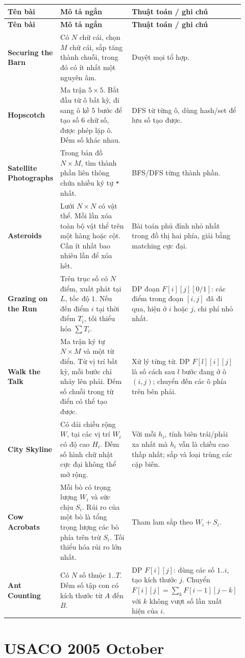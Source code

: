 \documentclass[11pt]{article}
\newenvironment{solutiontable}{%
  \small
  \setlength{\tabcolsep}{4pt}
  \renewcommand{\arraystretch}{1.14}
  \begin{longtable}{L{0.19\linewidth}L{0.39\linewidth}L{0.34\linewidth}}
  \toprule
  \textbf{Tên bài} & \textbf{Mô tả ngắn} & \textbf{Thuật toán / ghi chú}\\
  \midrule
  \endfirsthead
  \toprule
  \textbf{Tên bài} & \textbf{Mô tả ngắn} & \textbf{Thuật toán / ghi chú}\\
  \midrule
  \endhead
}{%
  \bottomrule
  \end{longtable}
  \normalsize
}
\newcommand{\problemrow}[3]{\textbf{#1} & #2 & #3\\\midrule}
\begin{document}
\begin{solutiontable}
\problemrow{Securing the Barn}{Có \(N\) chữ cái, chọn \(M\) chữ cái, sắp tăng thành chuỗi, trong đó có ít nhất một nguyên âm.}{Duyệt mọi tổ hợp.}
\problemrow{Hopscotch}{Ma trận \(5\times5\). Bắt đầu từ ô bất kỳ, đi sang ô kề \(5\) bước để tạo số \(6\) chữ số, được phép lặp ô. Đếm số khác nhau.}{DFS từ từng ô, dùng hash/set để lưu số tạo được.}
\problemrow{Satellite Photographs}{Trong bản đồ \(N\times M\), tìm thành phần liên thông chứa nhiều ký tự \texttt{*} nhất.}{BFS/DFS từng thành phần.}
\problemrow{Asteroids}{Lưới \(N\times N\) có vật thể. Mỗi lần xóa toàn bộ vật thể trên một hàng hoặc cột. Cần ít nhất bao nhiêu lần để xóa hết.}{Bài toán phủ đỉnh nhỏ nhất trong đồ thị hai phía, giải bằng matching cực đại.}
\problemrow{Grazing on the Run}{Trên trục số có \(N\) điểm, xuất phát tại \(L\), tốc độ \(1\). Nếu đến điểm \(i\) tại thời điểm \(T_i\), tối thiểu hóa \(\sum T_i\).}{DP đoạn \(F[i][j][0/1]\): các điểm trong đoạn \([i,j]\) đã đi qua, hiện ở \(i\) hoặc \(j\), chi phí nhỏ nhất.}
\problemrow{Walk the Talk}{Ma trận ký tự \(N\times M\) và một từ điển. Từ vị trí bất kỳ, mỗi bước chỉ nhảy lên phải. Đếm số chuỗi trong từ điển có thể tạo được.}{Xử lý từng từ. DP \(F[l][i][j]\) là số cách sau \(l\) bước đang ở ô \((i,j)\); chuyển đến các ô phía trên bên phải.}
\problemrow{City Skyline}{Có dải chiều rộng \(W\), tại các vị trí \(W_i\) có độ cao \(H_i\). Đếm số hình chữ nhật cực đại không thể mở rộng.}{Với mỗi \(h_i\), tính biên trái/phải xa nhất mà \(h_i\) vẫn là chiều cao thấp nhất; sắp và loại trùng các cặp biên.}
\problemrow{Cow Acrobats}{Mỗi bò có trọng lượng \(W_i\) và sức chịu \(S_i\). Rủi ro của một bò là tổng trọng lượng các bò phía trên trừ \(S_i\). Tối thiểu hóa rủi ro lớn nhất.}{Tham lam sắp theo \(W_i+S_i\).}
\problemrow{Ant Counting}{Có \(N\) số thuộc \(1..T\). Đếm số tập con có kích thước từ \(A\) đến \(B\).}{DP \(F[i][j]\): dùng các số \(1..i\), tạo kích thước \(j\). Chuyển \(F[i][j]=\sum_k F[i-1][j-k]\) với \(k\) không vượt số lần xuất hiện của \(i\).}
\end{solutiontable}

\section{USACO 2005 October}
\end{document}
